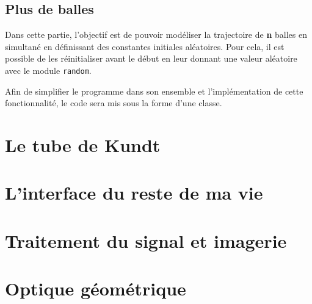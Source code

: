 \documentclass[a4paper,11pt]{article}
\begin{document}
\subsection{Plus de balles}

Dans cette partie, l'objectif est de pouvoir modéliser la trajectoire de \textbf{n} balles en simultané en définissant des constantes initiales aléatoires. Pour cela, il est possible de les réinitialiser avant le début en leur donnant une valeur aléatoire avec le module \verb|random|.

Afin de simplifier le programme dans son ensemble et l'implémentation de cette fonctionnalité, le code sera mis sous la forme d'une classe.


\section{Le tube de Kundt}

\section{L'interface du reste de ma vie}

\section{Traitement du signal et imagerie}
\section{Optique géométrique}
\end{document}
